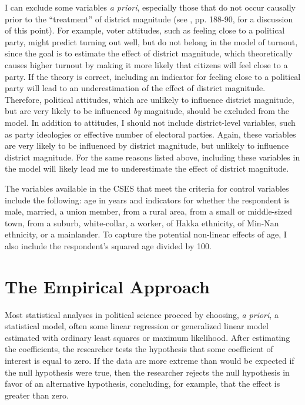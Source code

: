 \documentclass[12pt]{article}
\begin{document}
I can exclude some variables \textit{a priori}, especially those that do not occur causally prior to the ``treatment'' of district magnitude (see \citealt{GelmanHill2007}, pp. 188-90, for a discussion of this point). For example, voter attitudes, such as feeling close to a political party, might predict turning out well, but do not belong in the model of turnout, since the goal is to estimate the effect of district magnitude, which theoretically causes higher turnout by making it more likely that citizens will feel close to a party. If the theory is correct, including an indicator for feeling close to a political party will lead to an underestimation of the effect of district magnitude. Therefore, political attitudes, which are unlikely to influence district magnitude, but are very likely to be influenced \textit{by} magnitude, should be excluded from the model. In addition to attitudes, I should not include district-level variables, such as party ideologies or effective number of electoral parties. Again, these variables are very likely to be influenced by district magnitude, but unlikely to influence district magnitude. For the same reasons listed above, including these variables in the model will likely lead me to underestimate the effect of district magnitude. 

The variables available in the CSES that meet the criteria for control variables include the following: age in years and indicators for whether the respondent is male, married, a union member, from a rural area, from a small or middle-sized town, from a suburb, white-collar, a worker, of Hakka ethnicity, of Min-Nan ethnicity, or  a mainlander. To capture the potential non-linear effects of age, I also include the respondent's squared age divided by 100.

\section*{The Empirical Approach}

Most statistical analyses in political science proceed by choosing, \textit{a priori}, a statistical model, often some linear regression or generalized linear model estimated with ordinary least squares or maximum likelihood. After estimating the coefficients, the researcher tests the hypothesis that some coefficient of interest is equal to zero. If the data are more extreme than would be expected if the null hypothesis were true, then the researcher rejects the null hypothesis in favor of an alternative hypothesis, concluding, for example, that the effect is greater than zero.
\end{document}
